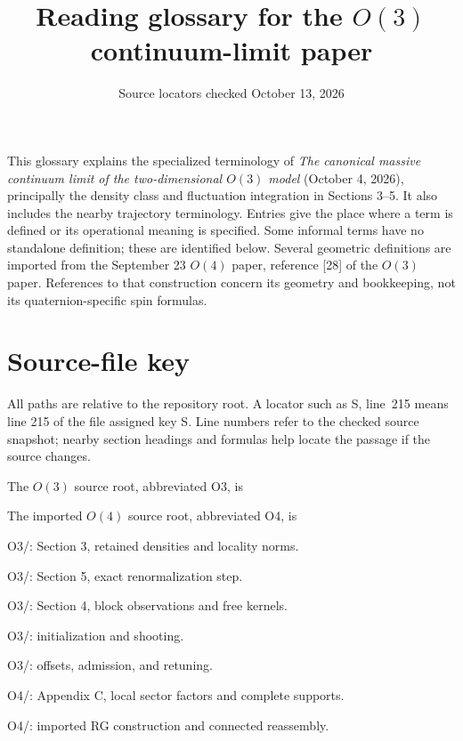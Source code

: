 \documentclass[11pt]{article}
\title{Reading glossary for the \(O(3)\) continuum-limit paper}
\author{}
\date{Source locators checked October 13, 2026}
\newcommand{\src}[2]{\textsf{#1}, line~#2}
\begin{document}
\maketitle

This glossary explains the specialized terminology of
\emph{The canonical massive continuum limit of the two-dimensional
\(O(3)\) model} (October 4, 2026), principally the density class and
fluctuation integration in Sections 3--5.  It also includes the nearby
trajectory terminology.  Entries give the place where a term is defined
or its operational meaning is specified.  Some informal terms have no
standalone definition; these are identified below.  Several geometric
definitions are imported from the September 23 \(O(4)\) paper, reference
[28] of the \(O(3)\) paper.  References to that construction concern its
geometry and bookkeeping, not its quaternion-specific spin formulas.

\section*{Source-file key}

All paths are relative to the repository root.  A locator such as
\src{S}{215} means line 215 of the file assigned key S.  Line numbers
refer to the checked source snapshot; nearby section headings and
formulas help locate the passage if the source changes.

The \(O(3)\) source root, abbreviated \textsf{O3}, is
\begin{quote}\small
{}
\end{quote}
The imported \(O(4)\) source root, abbreviated \textsf{O4}, is
\begin{quote}\small
{}
\end{quote}
\begin{description}[itemsep=2pt,style=standard,leftmargin=16mm]
\item[S] O3/: Section 3, retained densities and locality norms.
\item[R] O3/: Section 5, exact renormalization step.
\item[F] O3/: Section 4, block observations and free kernels.
\item[Sh] O3/: initialization and shooting.
\item[T] O3/: offsets, admission, and retuning.
\item[G4] O4/: Appendix C, local sector factors and complete supports.
\item[R4] O4/: imported RG construction and connected reassembly.
\end{description}
\end{document}
